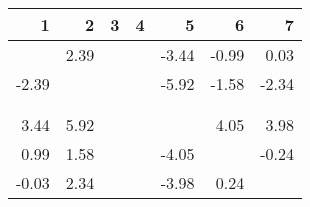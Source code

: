 \begin{table}[ht]
\centering
\begin{tabular}{rrrrrrr}
  \hline
1 & 2 & 3 & 4 & 5 & 6 & 7 \\ 
  \hline
 & 2.39 &  &  & -3.44 & -0.99 & 0.03 \\ 
  -2.39 &  &  &  & -5.92 & -1.58 & -2.34 \\ 
   &  &  &  &  &  &  \\ 
   &  &  &  &  &  &  \\ 
  3.44 & 5.92 &  &  &  & 4.05 & 3.98 \\ 
  0.99 & 1.58 &  &  & -4.05 &  & -0.24 \\ 
  -0.03 & 2.34 &  &  & -3.98 & 0.24 &  \\ 
   \hline
\end{tabular}
\end{table}
